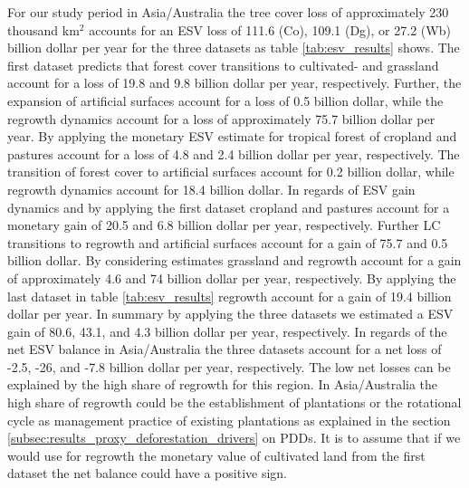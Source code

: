 		For our study period in Asia/Australia the tree cover loss of approximately 230 thousand km$^2$ accounts for an \ac{ESV} loss of 111.6 (Co), 109.1 (Dg), or 27.2 (Wb) billion dollar per year for the three datasets as table \ref{tab:esv_results} shows. The first dataset predicts that forest cover transitions to cultivated- and grassland account for a loss of 19.8 and 9.8 billion dollar per year, respectively. Further, the expansion of artificial surfaces account for a loss of 0.5 billion dollar, while the regrowth dynamics account for a loss of approximately 75.7 billion dollar per year. By applying the monetary \ac{ESV} estimate for tropical forest of \citet{Siikamaki2015} cropland and pastures account for a loss of 4.8 and 2.4 billion dollar per year, respectively. The transition of forest cover to artificial surfaces account for 0.2 billion dollar, while regrowth dynamics account for 18.4 billion dollar. In regards of \ac{ESV} gain dynamics and by applying the first dataset cropland and pastures account for a monetary gain of 20.5 and 6.8 billion dollar per year, respectively. Further \ac{LC} transitions to regrowth and artificial surfaces account for a gain of 75.7 and 0.5 billion dollar. By considering \citet{Groot2012} estimates grassland and regrowth account for a gain of approximately 4.6 and 74 billion dollar per year, respectively. By applying the last dataset in table \ref{tab:esv_results} regrowth account for a gain of 19.4 billion dollar per year. In summary by applying the three datasets we estimated a \ac{ESV} gain of 80.6, 43.1, and 4.3 billion dollar per year, respectively. In regards of the net \ac{ESV} balance in Asia/Australia the three datasets account for a net loss of -2.5, -26, and -7.8 billion dollar per year, respectively. The low net losses can be explained by the high share of regrowth for this region. In Asia/Australia the high share of regrowth could be the establishment of plantations or the rotational cycle as management practice of existing plantations as explained in the section \ref{subsec:results_proxy_deforestation_drivers} on \acp{PDD}. It is to assume that if we would use for regrowth the monetary value of cultivated land from the first dataset the net balance could have a positive sign.

